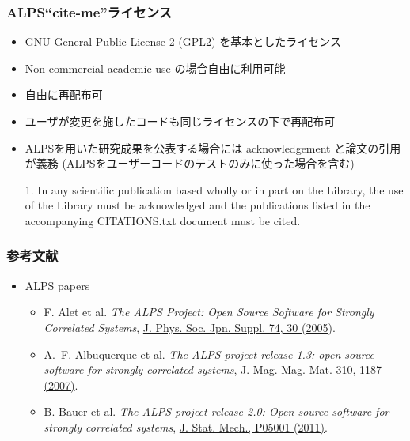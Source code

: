 \begin{frame}
\frametitle{ALPS``cite-me''ライセンス}
  \begin{itemize}
  \item GNU General Public License 2 (GPL2) を基本としたライセンス
  \item Non-commercial academic use の場合自由に利用可能
  \item 自由に再配布可
  \item ユーザが変更を施したコードも同じライセンスの下で再配布可
  \item ALPSを用いた研究成果を公表する場合には acknowledgement と論文の引用が義務 (ALPSをユーザーコードのテストのみに使った場合を含む)
    \begin{minipage}{.9\textwidth}
    \begin{block}{}
      1. In any scientific publication based wholly or in part on the
      Library, the use of the Library must be acknowledged and the
      publications listed in the accompanying CITATIONS.txt document
      must be cited.
    \end{block}
    \end{minipage}
  \end{itemize}
\end{frame}

\begin{frame}
  \frametitle{参考文献}
  \begin{itemize}
  \item ALPS papers
    \begin{itemize}
    \item F. Alet et al. {\it The ALPS Project: Open Source Software for
      Strongly Correlated Systems}, \href{http://jpsj.ipap.jp/link?JPSJS/74S/30}{J. Phys. Soc. Jpn. Suppl. 74, 30 (2005)}.
    \item A.~F. Albuquerque et al. {\it The ALPS project release 1.3: open source software for strongly correlated systems}, \href{http://dx.doi.org/10.1016/j.jmmm.2006.10.304}{J. Mag. Mag. Mat. 310, 1187 (2007)}.
    \item B. Bauer et al. {\it The ALPS project release 2.0: Open source software for strongly correlated systems}, \href{http://iopscience.iop.org/1742-5468/2011/05/P05001}{J. Stat. Mech., P05001 (2011)}.
    \end{itemize}
  \end{itemize}
\end{frame}

